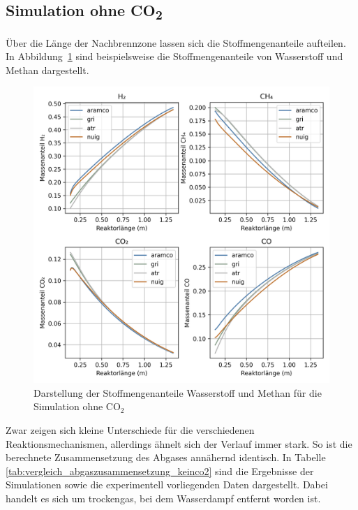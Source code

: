 \documentclass[footmark=none]{tubaf-thesis}
\begin{document}
        \subsection{Simulation ohne CO\textsubscript{2}}
        Über die Länge der Nachbrennzone lassen sich die Stoffmengenanteile aufteilen. In Abbildung~\ref{fig:vergleich_h2_ch4_keinco2} sind beispielsweise die Stoffmengenanteile von Wasserstoff und Methan dargestellt.
        \begin{figure}[H]
            \centering
            \includegraphics[width=0.9\linewidth]{img_py/H2_CH4_CO_CO2_keinCO2.png}
            \caption{Darstellung der Stoffmengenanteile Wasserstoff und Methan für die Simulation ohne CO$_2$}
            \label{fig:vergleich_h2_ch4_keinco2}
        \end{figure}
        Zwar zeigen sich kleine Unterschiede für die verschiedenen Reaktionsmechanismen, allerdings ähnelt sich der Verlauf immer stark. So ist die berechnete Zusammensetzung des Abgases annähernd identisch. In Tabelle \ref{tab:vergleich_abgaszusammensetzung_keinco2} sind die Ergebnisse der Simulationen sowie die experimentell vorliegenden Daten dargestellt. Dabei handelt es sich um trockengas, bei dem Wasserdampf entfernt worden ist. 
\end{document}
